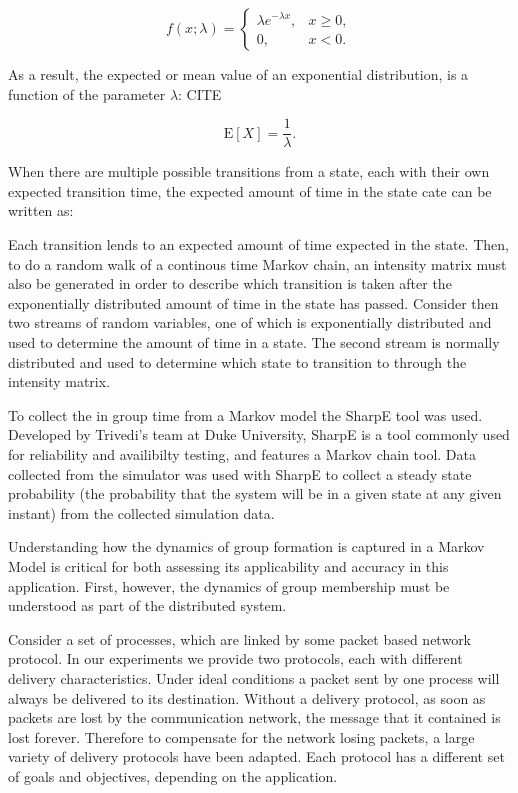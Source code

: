\begin{equation}
f(x;\lambda) = \begin{cases}
\lambda e^{-\lambda x}, & x \ge 0, \\
0, & x < 0.
\end{cases}
\end{equation}

As a result, the expected or mean value of an exponential distribution, is a function of
the parameter $\lambda$: CITE

\begin{equation}
\mathrm{E}[X] = \frac{1}{\lambda}. \!
\end{equation}

When there are multiple possible transitions from a state, each with their own
expected transition time, the expected amount of time in the state cate can be
written as:

Each transition lends to an expected amount of time expected in the state. Then,
to do a random walk of a continous time Markov chain, an intensity matrix must
also be generated in order to describe which transition is taken after the
exponentially distributed amount of time in the state has passed. Consider then
two streams of random variables, one of which is exponentially distributed and
used to determine the amount of time in a state. The second stream is normally
distributed and used to determine which state to transition to through the
intensity matrix.

To collect the in group time from a Markov model the SharpE tool was used.
Developed by Trivedi's team at Duke University, SharpE is a tool commonly used
for reliability and availibilty testing, and features a Markov chain tool. Data
collected from the simulator was used with SharpE to collect a steady state
probability (the probability that the system will be in a given state at any
given instant) from the collected simulation data.

Understanding how the dynamics of group formation is captured in a Markov Model 
is critical for both assessing its applicability and accuracy in this 
application. First, however, the dynamics of group membership must be 
understood as part of the distributed system.

Consider a set of processes, which are linked by some packet based network 
protocol. In our experiments we provide two protocols, each with different 
delivery characteristics. Under ideal conditions a packet sent by one process 
will always be delivered to its destination. Without a delivery protocol, as 
soon as packets are lost by the communication network, the message that it 
contained is lost forever. Therefore to compensate for the network losing 
packets, a large variety of delivery protocols have been adapted. Each protocol 
has a different set of goals and objectives, depending on the application.

